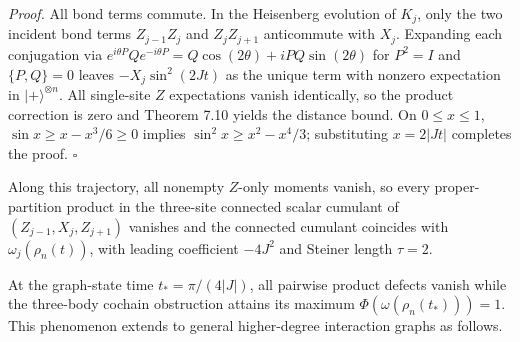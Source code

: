 \documentclass[
  11pt,
]{article}
\begin{document}
\emph{Proof.} All bond terms commute. In the Heisenberg evolution of \(K_j\), only the two incident bond terms \(Z_{j-1}Z_j\) and \(Z_jZ_{j+1}\) anticommute with \(X_j\). Expanding each conjugation via \(e^{i\theta P}Qe^{-i\theta P}=Q\cos(2\theta)+iPQ\sin(2\theta)\) for \(P^2=I\) and \(\{P,Q\}=0\) leaves \(-X_j\sin^2(2Jt)\) as the unique term with nonzero expectation in \(|+\rangle^{\otimes n}\). All single-site \(Z\) expectations vanish identically, so the product correction is zero and Theorem 7.10 yields the distance bound. On \(0\le x\le1\), \(\sin x\ge x-x^3/6\ge0\) implies \(\sin^2x\ge x^2-x^4/3\); substituting \(x=2|Jt|\) completes the proof. \(\square\)

Along this trajectory, all nonempty \(Z\)-only moments vanish, so every proper-partition product in the three-site connected scalar cumulant of \((Z_{j-1},X_j,Z_{j+1})\) vanishes and the connected cumulant coincides with \(\omega_j(\rho_n(t))\), with leading coefficient \(-4J^2\) and Steiner length \(\tau=2\).

At the graph-state time \(t_* =\pi/(4|J|)\), all pairwise product defects vanish while the three-body cochain obstruction attains its maximum \(\Phi(\omega(\rho_n(t_*))) = 1\). This phenomenon extends to general higher-degree interaction graphs as follows.
\end{document}
